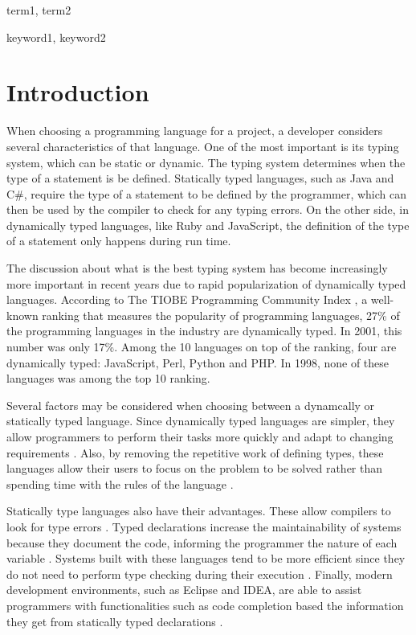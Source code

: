\documentclass[preprint]{sigplanconf}
\begin{document}

\terms
term1, term2

\keywords
keyword1, keyword2

\section{Introduction}
When choosing a programming language for a project, a developer considers several characteristics of that language.
One of the most important is its typing system, which can be static or dynamic.
The typing system determines when the type of a statement is be defined\cite{types_and_programming_languages}. 
Statically typed languages, such as Java and C\#, require the type of a statement to be defined by the programmer, which can then be used by the compiler to check for any typing errors. 
On the other side, in dynamically typed languages, like Ruby and JavaScript, the definition of the type of a statement only happens during run time.

The discussion about what is the best typing system has become increasingly more important in recent years due to rapid popularization of dynamically typed languages. 
According to The TIOBE Programming Community Index \cite{tiobe}, a well-known ranking that measures the popularity of programming languages, 27\% of the programming languages in the industry are dynamically typed. 
In 2001, this number was only 17\%. 
Among the 10 languages on top of the ranking, four are dynamically typed: JavaScript, Perl, Python and PHP. 
In 1998, none of these languages was among the top 10 ranking.

Several factors may be considered when choosing between a dynamcally or statically typed language. 
Since dynamically typed languages are simpler, they allow programmers to perform their tasks more quickly \cite{types_and_programming_languages} and adapt to changing requirements \cite{gradual_typing}.
Also, by removing the repetitive work of defining types, these languages allow their users to focus on the problem to be solved rather than spending time with the rules of the language \cite{dynamically_typed_languages}.

Statically type languages also have their advantages. 
These allow compilers to look for type errors \cite{should_your_specification_language_be_typed}. 
Typed declarations increase the maintainability of systems because they document the code, informing the programmer the nature of each variable \cite{type_systems,mayer2012static}. 
Systems built with these languages tend to be more efficient since they do not need to perform type checking during their execution \cite{bruce2002foundations,jit}. 
Finally, modern development environments, such as Eclipse and IDEA, are able to assist programmers with functionalities such as code completion based the information
they get from statically typed declarations \cite{bruch2009learning}.
\end{document}
